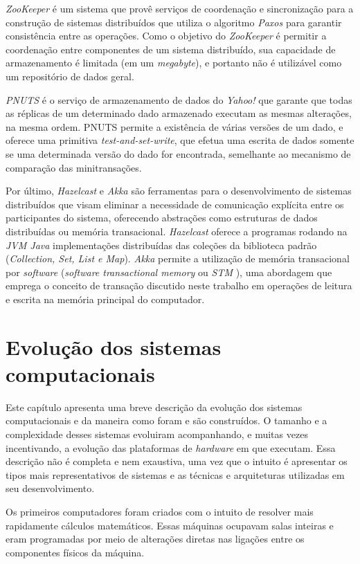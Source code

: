 \documentclass[11pt,twoside,a4paper]{book}
\begin{document}
\emph{ZooKeeper} é um sistema que provê serviços de coordenação e sincronização para a construção de sistemas distribuídos que utiliza o algoritmo \emph{Paxos} \cite{paxos} para garantir consistência entre as operações. Como o objetivo do \emph{ZooKeeper} é permitir a coordenação entre componentes de um sistema distribuído, sua capacidade de armazenamento é limitada (em um \emph{megabyte}), e portanto não é utilizável como um repositório de dados geral.

\emph{PNUTS} é o serviço de armazenamento de dados do \emph{Yahoo!} que garante que todas as réplicas de um determinado dado armazenado executam as mesmas alterações, na mesma ordem. PNUTS permite a existência de várias versões de um dado, e oferece uma primitiva \emph{test-and-set-write}, que efetua uma escrita de dados somente se uma determinada versão do dado for encontrada, semelhante ao mecanismo de comparação das minitransações.

Por último, \emph{Hazelcast} \cite{hazelcast} e \emph{Akka} \cite{akka} são ferramentas para o desenvolvimento de sistemas distribuídos que visam eliminar a necessidade de comunicação explícita entre os participantes do sistema, oferecendo abstrações como estruturas de dados
distribuídas ou memória transacional. \emph{Hazelcast} oferece a programas rodando na \emph{JVM Java} implementações distribuídas das coleções da biblioteca padrão (\emph{Collection, Set, List e Map}). \emph{Akka} permite a utilização de memória transacional por \emph{software} (\emph{software transactional memory} ou \emph{STM} \cite{stm}), uma abordagem que emprega o conceito de transação discutido 
neste trabalho em operações de leitura e escrita na memória principal do computador.

\chapter{Evolução dos sistemas computacionais}
\label{chap:evolucao}
Este capítulo apresenta uma breve descrição da evolução dos sistemas computacionais e da maneira como foram e são construídos. O tamanho e a complexidade desses sistemas evoluiram acompanhando, e muitas vezes incentivando, a evolução das plataformas de \emph{hardware} em que executam. Essa descrição não é completa e nem exaustiva, uma vez que o intuito é apresentar os tipos mais representativos de sistemas e as técnicas e arquiteturas utilizadas em seu desenvolvimento.

Os primeiros computadores foram criados com o intuito de resolver mais rapidamente cálculos matemáticos. Essas máquinas ocupavam salas inteiras e eram programadas por meio de alterações diretas nas ligações entre os componentes físicos da máquina. 
\end{document}
